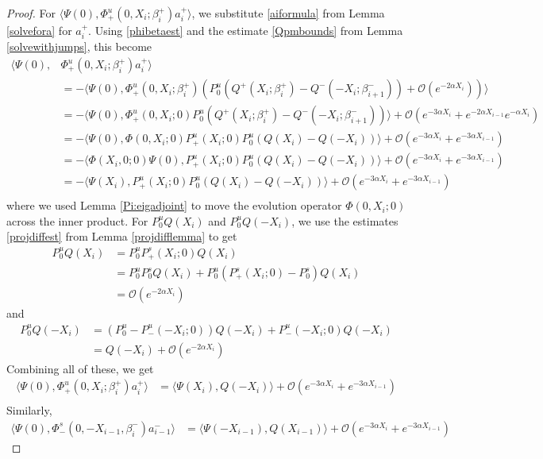 \documentclass[thesis.tex]{subfiles}
\begin{document}
\begin{lemma}
\begin{proof}
For $\langle \Psi(0), \Phi^u_+(0, X_i; \beta_i^+) a_i^+ \rangle$, we substitute \eqref{aiformula} from Lemma \ref{solvefora} for $a_i^+$. Using \eqref{phibetaest} and the estimate \eqref{Qpmbounds} from Lemma \ref{solvewithjumps}, this become
\begin{align*}
\langle \Psi(0), &\Phi^u_+(0, X_i; \beta_i^+) a_i^+ \rangle \\
&= -\langle \Psi(0), \Phi^u_+(0, X_i; \beta_i^+)\left( P^u_0 ( Q^+(X_i; \beta_i^+) - Q^-(-X_i; \beta_{i+1}^-)) + \mathcal{O}( e^{-2 \alpha X_i} ) \right) \rangle \\
&= -\langle \Psi(0), \Phi^u_+(0, X_i; 0) P^u_0 \left( Q^+(X_i; \beta_i^+) - Q^-(-X_i; \beta_{i+1}^-) \right) \rangle + \mathcal{O}( e^{-3 \alpha X_i} + e^{-2\alpha X_{i-1}}e^{-\alpha X_i} )\\
&= -\langle \Psi(0), \Phi(0, X_i; 0) P^u_+(X_i; 0) P^u_0 \left( Q(X_i) - Q(-X_i) \right) \rangle + \mathcal{O}( e^{-3 \alpha X_i} + e^{-3\alpha X_{i-1}})\\
&= -\langle \Phi(X_i, 0; 0) \Psi(0), P^u_+(X_i; 0) P^u_0 \left( Q(X_i) - Q(-X_i) \right) \rangle + \mathcal{O}( e^{-3 \alpha X_i} + e^{-3\alpha X_{i-1}})\\
&= -\langle \Psi(X_i), P^u_+(X_i; 0) P^u_0 \left( Q(X_i) - Q(-X_i) \right) \rangle + \mathcal{O}( e^{-3 \alpha X_i} + e^{-3\alpha X_{i-1}})\\
\end{align*}
where we used Lemma \ref{Pi:eigadjoint} to move the evolution operator $\Phi(0, X_i; 0)$ across the inner product.
For $P^u_0 Q(X_i)$ and $P^u_0 Q(-X_i)$, we use the estimates \eqref{projdiffest} from Lemma \ref{projdifflemma} to get
\begin{align*}
P^u_0 Q(X_i) &= P^u_0 P^s_+(X_i; 0) Q(X_i) \\
&= P^u_0 P^s_0 Q(X_i) + P^u_0 ( P^s_+(X_i; 0) - P^s_0) Q(X_i) \\
&= \mathcal{O}(e^{-2\alpha X_i})
\end{align*}
and
\begin{align*}
P^u_0 Q(-X_i) &= (P^u_0 - P^u_-(-X_i; 0)) Q(-X_i) + P^u_-(-X_i; 0) Q(-X_i) \\
&= Q(-X_i) + \mathcal{O}(e^{-2\alpha X_i})
\end{align*}
Combining all of these, we get
\begin{align*}
\langle \Psi(0), \Phi^u_+(0, X_i; \beta_i^+) a_i^+ \rangle 
&= \langle \Psi(X_i), Q(-X_i) \rangle + \mathcal{O}( e^{-3 \alpha X_i} + e^{-3\alpha X_{i-1}})\\
\end{align*}
Similarly,
\begin{align*}
\langle \Psi(0), \Phi^s_-(0, -X_{i-1}, \beta_i^-) a_{i-1}^- \rangle &= 
\langle \Psi(-X_{i-1}), Q(X_{i-1}) \rangle + \mathcal{O}( e^{-3 \alpha X_i} + e^{-3\alpha X_{i-1}})
\end{align*}


\end{proof}
\end{lemma}
\end{document}
